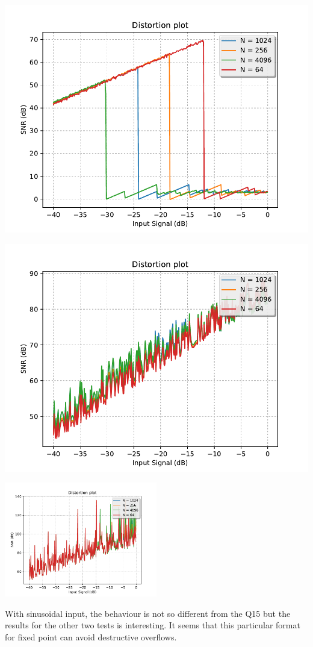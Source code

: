 \documentclass[paper=a4, fontsize=12pt]{scrartcl} %
\numberwithin{equation}{section} %
\numberwithin{figure}{section} %
\numberwithin{table}{section} %
\begin{document}
\begin{minipage}{.5\textwidth}
    \includegraphics[width = \textwidth]{../figQ24/TEST_0.pdf}
\end{minipage}
\begin{minipage}{.5\textwidth}
    \includegraphics[width = \textwidth]{../figQ24/TEST_1.pdf}
\end{minipage}

\begin{minipage}{\textwidth}
    \centering
    \includegraphics[width = 0.5\textwidth]{../figQ24/TEST_2.pdf}
\end{minipage}

With sinusoidal input, the behaviour is not so different from the Q15 but the results for
the other two tests is interesting. It seems that this particular format for fixed point
can avoid destructive overflows.
\end{document}
